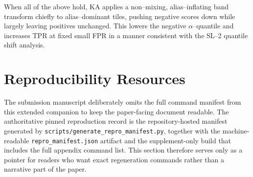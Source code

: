 \documentclass[11pt]{article}
\DeclareRobustCommand{\path}[1]{\nolinkurl{#1}}
\newif\ifSTAPSUPPLEMENTONLY
\begin{document}
When all of the above hold, KA applies a non--mixing, alias--inflating band transform chiefly to alias--dominant tiles, pushing negative scores down while largely leaving positives unchanged. This lowers the negative $\alpha$--quantile and increases TPR at fixed small FPR in a manner consistent with the SL--2 quantile shift analysis.



\ifSTAPSUPPLEMENTONLY

\else
\section{Reproducibility Resources}
\label{app:repro}
The submission manuscript deliberately omits the full command manifest from this extended companion to keep the paper-facing document readable. The authoritative pinned reproduction record is the repository-hosted manifest generated by \path{scripts/generate_repro_manifest.py}, together with the machine-readable \path{repro_manifest.json} artifact and the supplement-only build that includes the full appendix command list. This section therefore serves only as a pointer for readers who want exact regeneration commands rather than a narrative part of the paper.
\fi

\fi %
\end{document}
